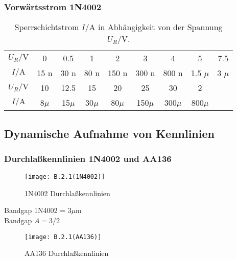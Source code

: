 \documentclass[
	a4paper, %
	12pt, %
]{CSUniSchoolLabReport}
\newcommand{\micro}{\ensuremath{\mu}}
\newcommand{\nano}{n}
\begin{document}
\subsubsection{Vorwärtsstrom 1N4002}

\begin{table}[H]
\centering
\begin{tabular}{c|cccccccc}
$U_R/\si{\volt}$ & 0 & 0.5 & 1 & 2 & 3 & 4 & 5 & 7.5 \\
$I/\si{\ampere}$ & 15 \nano& 30 \nano& 80 \nano& 150 \nano& 300 \nano& 800 \nano& 1.5 \micro& 3 \micro\\
\hline
$U_R/\si{\volt}$ & 10 & 12.5 & 15 & 20 & 25 & 30 & 2 & \\
$I/\si{\ampere}$ & 8\micro& 15\micro& 30\micro& 80\micro& 150\micro& 300\micro& 800\micro& \\
\end{tabular}
\caption{Sperrschichtstrom \(I/\si{\ampere}\) in Abhängigkeit von der Spannung \(U_R/\si{\volt}\).}
\label{tab:uv-cf}
\end{table}



\subsection{Dynamische Aufnahme von Kennlinien}

\subsubsection{Durchlaßkennlinien 1N4002 und AA136}
\begin{figure}[H] %
	\centering %
	\texttt{[image: B.2.1(1N4002)]} %
	\caption{1N4002 Durchlaßkennlinien}
\end{figure}
Bandgap 1N4002 = 3\micro m  
\\
Bandgap $A = 3/2$
\begin{figure}[H] %
	\centering %
	\texttt{[image: B.2.1(AA136)]} %
	\caption{AA136 Durchlaßkennlinien}
\end{figure}
\end{document}
